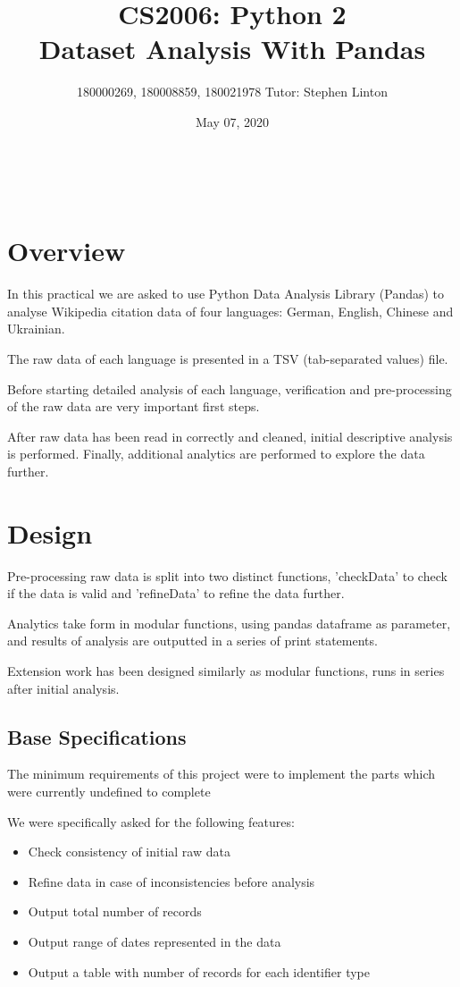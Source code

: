 \documentclass[12pt,a4paper,final]{article}
\begin{document}
\title{%
    CS2006: Python 2 \\
    \Large Dataset Analysis With Pandas} \\
\author{180000269, 180008859, 180021978 Tutor: Stephen Linton}
\date{May 07, 2020}
\maketitle

\section*{Overview}
In this practical we are asked to use Python Data Analysis Library (Pandas) to analyse Wikipedia citation data of four languages: German, English, Chinese and Ukrainian.

The raw data of each language is presented in a TSV (tab-separated values) file.

Before starting detailed analysis of each language, verification and pre-processing of the raw data are very important first steps.

After raw data has been read in correctly and cleaned, initial descriptive analysis is performed. Finally, additional analytics are performed to explore the data further.

\section*{Design}
Pre-processing raw data is split into two distinct functions, 'checkData' to check if the data is valid and 'refineData' to refine the data further.

Analytics take form in modular functions, using pandas dataframe as parameter, and results of analysis are outputted in a series of print statements.

Extension work has been designed similarly as modular functions, runs in series after initial analysis.

\subsection*{Base Specifications}

The minimum requirements of this project were to implement the parts which were currently undefined
to complete

We were specifically asked for the following features:

\begin{itemize}[noitemsep]
    \item Check consistency of initial raw data
    \item Refine data in case of inconsistencies before analysis
    \item Output total number of records
    \item Output range of dates represented in the data
    \item Output a table with number of records for each identifier type
\end{itemize}
\end{document}
